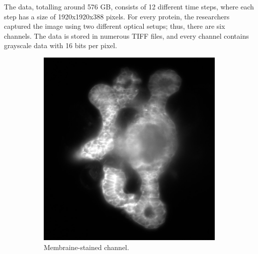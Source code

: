 \documentclass[
  digital,     %
  oneside,     %
  nosansbold,  %
  nocolorbold, %
  lof,         %
  lot,         %
]{fithesis4}
\begin{document}
The data, totalling around 576 GB, consists of 12 different time steps, where
each step has a size of 1920x1920x388 pixels. For every protein, the researchers
captured the image using two different optical setups; thus, there are six
channels. The data is stored in numerous TIFF files, and every channel contains
grayscale data with 16 bits per pixel. 
\begin{figure}
    \begin{subfigure}[t]{0.4\textwidth}
        \centering
        \includegraphics[width=\textwidth]{resources/C3-t006-200-scaled.jpg}
        \caption{Membraine-stained channel.}
        \label{fig:data_example_membraine}
    \end{subfigure}
    \begin{subfigure}[t]{0.4\textwidth}
        \centering

\end{subfigure}
\end{figure}
\end{document}
